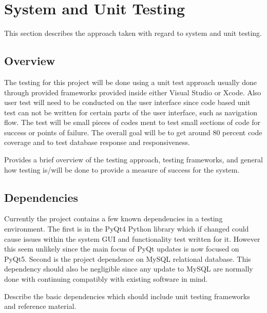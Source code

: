 
\chapter{System  and Unit Testing}

This section describes the approach taken with regard to system and unit testing. 

\section{Overview}
The testing for this project will be done using a unit test approach usually done through provided frameworks provided inside either Visual Studio or Xcode. Also user test will need to be conducted on the user interface since code based unit test can not be written for certain parts of the user interface, such as navigation flow. The test will be small pieces of codes ment to test small sections of code for success or points of failure. The overall goal will be to get around 80 percent code coverage and to test database response and responsiveness.

Provides a brief overview of the testing approach, testing frameworks, and general 
how testing is/will be done to provide a measure of success for the system. 



\section{Dependencies}
Currently the project contains a few known dependencies in a testing environment. The first is in the PyQt4 Python library which if changed could cause issues within the system GUI and functionality test written for it. However this seem unlikely since the main focus of PyQt updates is now focused on PyQt5. Second is the project dependence on MySQL relational database. This dependency should also be negligible since any update to MySQL are normally done with continuing compatibly with existing software in mind.

Describe the basic dependencies which should include unit testing frameworks and 
reference material. 


